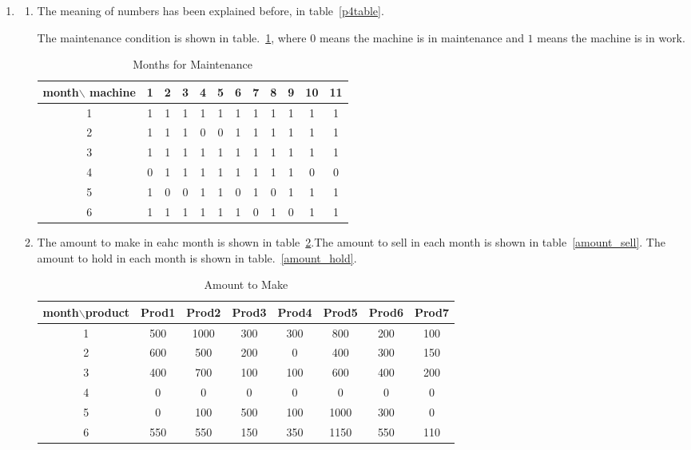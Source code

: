 \documentclass[12pt,a4paper]{article}
\makeatletter
\newtheorem*{solution}{Solution}
\theoremstyle{definition}
\renewenvironment{solution}[1][Solution] {\par\pushQED{\qed}\normalfont\topsep6\p@\@plus6\p@\relax\trivlist\item[\hskip\labelsep\bfseries#1\@addpunct{.}]\ignorespaces}{\popQED\endtrivlist\@endpefalse} \makeatother
\makeatother
\begin{document}
\begin{enumerate}
\begin{solution}
\begin{enumerate}
\begin{enumerate}
    \item 
    The meaning of numbers has been explained before, in table~\ref{p4table}. 
    
    The maintenance condition is shown in table.~\ref{maint}, where $0$ means the machine is in maintenance and $1$ means the machine is in work.
    
    \begin{table}[htbp]
        \centering
        \begin{tabular}{|c|ccccccccccc|}
        \hline
         month$\backslash$ machine&1&	2&	3&	4	&5&	6&	7&	8&	9&	10&	11\\
         \hline
1&1&	1&	1&	1&	1&	1&	1&	1&	1&	1&	1\\
2&1&	1&	1&	0&	0&	1&	1&	1&	1&	1&	1\\
3&1&	1&	1&	1&	1&	1&	1&	1&	1&	1&	1\\
4&0&	1&	1&	1&	1&	1&	1&	1&	1&	0&	0\\
5&1&	0&	0&	1&	1&	0&	1&	0&	1&	1&	1\\
6&1&	1&	1&	1&	1&	1&	0&	1&	0&	1&	1\\
\hline

    \end{tabular}
        \caption{Months for Maintenance}
        \label{maint}
    \end{table}

\item
The amount to make in eahc month is shown in table~\ref{amount_make}.The amount to sell in each month is shown in table~\ref{amount_sell}.
The amount to hold in each month is shown in table.~\ref{amount_hold}.

\begin{table}[htbp]
    \centering
    \begin{tabular}{|c|ccccccc|}
    \hline
       month$\backslash$product & Prod1 &	Prod2&	Prod3 &	Prod4 &	Prod5&	Prod6&	Prod7\\
       \hline
1&500&	1000&	300	&300&	800	&200&	100\\
2&600&	500&	200	&0&	400&	300&	150\\
3&400&	700	&100&	100&	600	&400&	200\\
4&0&	0&	0&	0&	0& 0&	0\\
5&0	&100&	500&	100	&1000&	300&	0\\
6&550&	550&	150	&350&	1150&	550&	110\\
\hline
    \end{tabular}
    \caption{Amount to Make}
    \label{amount_make}
\end{table}


\end{enumerate}
\end{enumerate}
\end{solution}
\end{enumerate}
\end{document}

